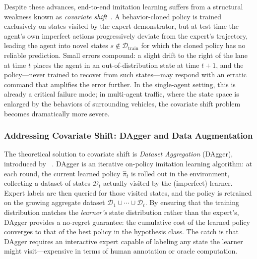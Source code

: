\documentclass[12pt, a4paper]{article}
\begin{document}
Despite these advances, end-to-end imitation learning suffers from a
structural weakness known as \emph{covariate shift}~\cite{bansal2018chauffeur}.
A behavior-cloned policy is trained exclusively on states visited by the expert
demonstrator, but at test time the agent's own imperfect actions progressively
deviate from the expert's trajectory, leading the agent into novel states
$s \notin \mathcal{D}_{\text{train}}$ for which the cloned policy has no
reliable prediction.  Small errors compound: a slight drift to the right of the
lane at time $t$ places the agent in an out-of-distribution state at time
$t+1$, and the policy---never trained to recover from such states---may respond
with an erratic command that amplifies the error further.  In the single-agent
setting, this is already a critical failure mode; in multi-agent traffic, where
the state space is enlarged by the behaviors of surrounding vehicles, the
covariate shift problem becomes dramatically more severe.

\subsubsection{Addressing Covariate Shift: DAgger and Data Augmentation}

The theoretical solution to covariate shift is \emph{Dataset Aggregation}
(DAgger), introduced by \citeauthor{ross2011reduction}~\cite{ross2011reduction}.
DAgger is an iterative on-policy imitation learning algorithm: at each round,
the current learned policy $\hat{\pi}_t$ is rolled out in the environment,
collecting a dataset of states $\mathcal{D}_t$ actually visited by the
(imperfect) learner.  Expert labels are then queried for those visited states,
and the policy is retrained on the growing aggregate dataset
$\mathcal{D}_1 \cup \cdots \cup \mathcal{D}_t$.  By ensuring that the
training distribution matches the \emph{learner's} state distribution rather
than the expert's, DAgger provides a no-regret guarantee: the cumulative
cost of the learned policy converges to that of the best policy in the
hypothesis class.  The catch is that DAgger requires an interactive expert
capable of labeling any state the learner might visit---expensive in terms of
human annotation or oracle computation.
\end{document}
